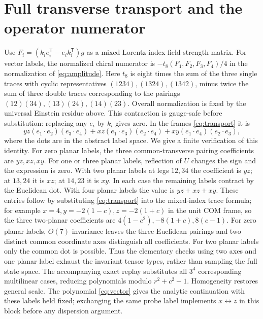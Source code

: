 \documentclass[11pt]{article}
\begin{document}
\section{Full transverse transport and the operator numerator}
Use $F_i=(k_i e_i^{\mathsf T}-e_i k_i^{\mathsf T})g$ as a mixed
Lorentz-index field-strength matrix. For vector labels, the
normalized chiral numerator is $-t_8(F_1,F_2,F_3,F_4)/4$ in the
normalization of \eqref{eq:amplitude}. Here $t_8$ is eight times
the sum of the three single traces with cyclic representatives
$(1234),(1324),(1342)$, minus twice the sum of three double traces
corresponding to the pairings $(12)(34),(13)(24),(14)(23)$. Overall
normalization is fixed by the universal Einstein residue above.
This contraction is gauge-safe before substitution: replacing any
$e_i$ by $k_i$ gives zero. In the frames \eqref{eq:transport} it is
\begin{equation}
 yz (e_1\cdot e_2)(e_3\cdot e_4)
 +xz (e_1\cdot e_3)(e_2\cdot e_4)
 +xy (e_1\cdot e_4)(e_2\cdot e_3),
 \label{eq:vector}
\end{equation}
where the dots are in the abstract label space.
We give a finite verification of this identity. For zero planar
labels, the three common-transverse pairing coefficients are
$yz,xz,xy$. For one or three planar labels, reflection of $U$ changes
the sign and the expression is zero. With two planar labels at legs
$12,34$ the coefficient is $yz$; at $13,24$ it is $xz$; at $14,23$ it
is $xy$. In each case the remaining labels contract by the Euclidean
dot. With four planar labels the value is $yz+xz+xy$. These entries
follow by substituting \eqref{eq:transport} into the mixed-index trace
formula; for example $x=4,y=-2(1-c),z=-2(1+c)$ in the unit COM frame,
so the three two-planar coefficients are
$4(1-c^2),-8(1+c),8(c-1)$.
For zero planar labels, $O(7)$ invariance leaves the three Euclidean
pairings and two distinct common coordinate axes distinguish all
coefficients. For two planar labels only the common dot is possible.
Thus the elementary checks using two axes and one planar label exhaust
the invariant tensor types, rather than sampling the full state space.
The accompanying exact replay substitutes all $3^4$ corresponding
multilinear cases, reducing polynomials modulo $r^2+c^2-1$.
Homogeneity restores general scale. The polynomial
\eqref{eq:vector} gives the analytic continuation with these labels
held fixed; exchanging the same probe label implements $x\leftrightarrow z$
in this block before any dispersion argument.
\end{document}
